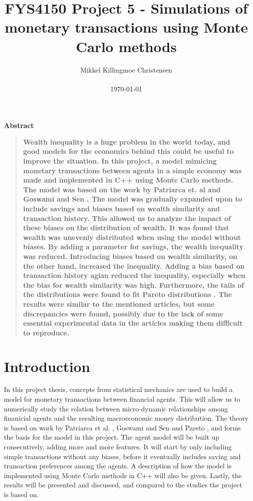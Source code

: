 \documentclass[11pt,a4paper,titlepage]{article}
\title{FYS4150 Project 5 - Simulations of monetary transactions using Monte Carlo methods}
\author
{Mikkel Killingmoe Christensen\\
\\
\normalsize{\today}
}
\date{}
\newenvironment{sciabstract}{%
\begin{quote} \bf}
{\end{quote}}
\begin{document}
 


\maketitle 


\tableofcontents
\clearpage


\begin{center}
{\large \textbf{Abstract}}
\end{center}
\begin{sciabstract}
Wealth inequality is a huge problem in the world today, and good models  for the economics behind this could be useful to improve the situation. In this project, a model mimicing monetary transactions between agents in a simple economy was made and implemented in C++ using Monte Carlo methods. The model was based on the work by Patriarca et. al \cite{Patriarca} and Goswami and Sen \cite{Goswami}. The model was gradually expanded upon to include savings and biases based on wealth similarity and transaction history. This allowed us to analyze the impact of these biases on the distribution of wealth. It was found that wealth was unevenly distributed when using the model without biases. By adding a parameter for savings, the wealth inequality was reduced. Introducing biases based on wealth similarity, on the other hand, increased the inequality.  Adding a bias based on transaction history agian reduced the inequality, especially when the bias for wealth similarity was high. Furthermore, the tails of the distributions were found to fit Pareto distributions \cite{Pareto}. The results were similar to the mentioned articles, but some discrepancies were found, possibly due to the lack of some essential experimental data in the articles making them difficult to reproduce.  
\end{sciabstract}




\section{Introduction}
In this project thesis, concepts from statistical mechanics are used to build a model for monetary transactions between financial agents. This will allow us to numerically study the relation between micro-dynamic relationships among finanicial agents and the resulting macroeconomic money distribution. The theory is based on work by Patriarca et al. \cite{Patriarca}, Goswami and Sen \cite{Goswami} and Pareto \cite{Pareto}, and forms the basis for the model in this project. The agent model will be built up consecutively, adding more and more features. It will start by only including simple transactions without any biases, before it eventually includes saving and transaction preferences among the agents. A description of how the model is implemented using Monte Carlo methods in C++ will also be given. Lastly, the results will be presented and discussed, and compared to the studies the project is based on. 
\end{document}
